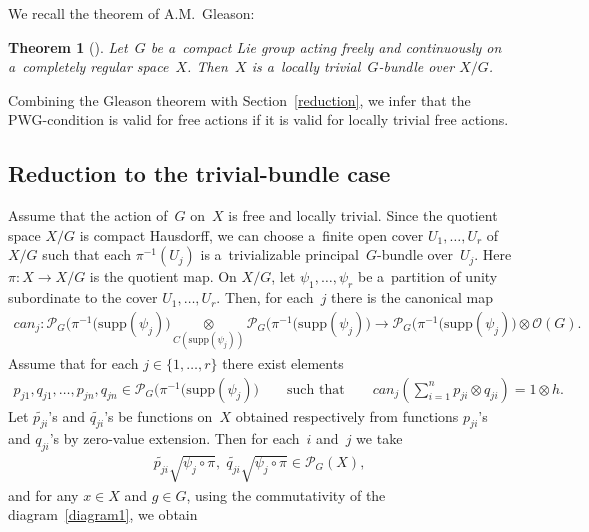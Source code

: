 \documentclass[11pt]{article}
\newtheorem{theorem}{Theorem}
\begin{document}
We recall the theorem of A.M.~Gleason:
\begin{theorem}[\cite{g-am50}] Let~$G$ be a~compact Lie group acting freely and continuously on a~completely regular space~$X$.
Then~$X$ is a~locally trivial~$G$-bundle over $X/G$.
\end{theorem}

Combining the Gleason theorem with Section~\ref{reduction}, we infer that the PWG-condition is valid for free actions if it
is valid for locally trivial free actions.

\subsection{Reduction to the trivial-bundle case}\label{tbundle}

Assume that the action of~$G$ on~$X$ is free and locally trivial.
Since the quotient space $X/G$ is compact Hausdorf\/f, we can choose a~f\/inite open cover $U_1,\ldots,U_r$ of $X/G$ such
that each $\pi^{-1}(U_j)$ is a~trivializable principal~$G$-bundle over~$U_j$.
Here $\pi\colon X\to X/G$ is the quotient map.
On $X/G$, let $\psi_1,\ldots,\psi_r$ be a~partition of unity subordinate to the cover $U_1,\ldots,U_r$.
Then, for each~$j$ there is the canonical map
\begin{gather*}
{can}_j\colon \mathcal{P}_G\big(\pi^{-1}(\mathrm{supp}(\psi_j)\big)\underset{C(\mathrm{supp}(\psi_j))} {\otimes}
\mathcal{P}_G\big(\pi^{-1}(\mathrm{supp}(\psi_j)\big) \longrightarrow
\mathcal{P}_G\big(\pi^{-1}(\mathrm{supp}(\psi_j)\big)\otimes{\mathcal O}(G).
\end{gather*}
Assume that for each $j\in\{1,\ldots,r\}$ there exist elements
\begin{gather*}
p_{j1},q_{j1},\ldots,p_{jn},q_{jn}\in \mathcal{P}_G\big(\pi^{-1}(\mathrm{supp}(\psi_j)\big)
\qquad
\text{such that}
\qquad
{can}_j\left(\sum\limits_{i=1}^n p_{ji}\otimes q_{ji}\right)=1\otimes h.
\end{gather*}
Let $\widetilde{p_{ji}}$'s and $\widetilde{q_{ji}}$'s be functions on~$X$ obtained respectively from functions
$p_{ji}$'s and $q_{ji}$'s by zero-value extension.
Then for each~$i$ and~$j$ we take
\begin{gather*}
\widetilde{p_{ji}}\sqrt{\psi_j\circ\pi},\; \widetilde{q_{ji}}\sqrt{\psi_j\circ\pi}
\in\mathcal{P}_G(X),
\end{gather*}
and for any $x\in X$ and $g\in G$, using the commutativity of the diagram~\eqref{diagram1}, we obtain
\end{document}
